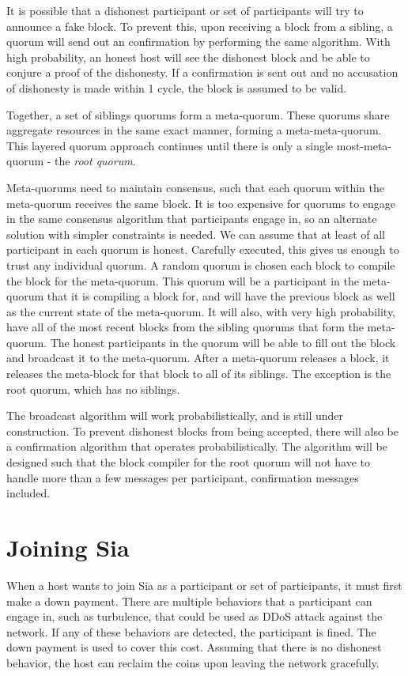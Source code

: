 \documentclass[twocolumn]{article}
\begin{document}
It is possible that a dishonest participant or set of participants will try to announce a fake block.
To prevent this, upon receiving a block from a sibling, a quorum will send out an confirmation by performing the same algorithm.
With high probability, an honest host will see the dishonest block and be able to conjure a proof of the dishonesty.
If a confirmation is sent out and no accusation of dishonesty is made within 1 cycle, the block is assumed to be valid.

Together, a set of siblings quorums form a meta-quorum.
These quorums share aggregate resources in the same exact manner, forming a meta-meta-quorum.
This layered quorum approach continues until there is only a single most-meta-quorum - the \textit{root quorum}.

Meta-quorums need to maintain consensus, such that each quorum within the meta-quorum receives the same block.
It is too expensive for quorums to engage in the same consensus algorithm that participants engage in, so an alternate solution with simpler constraints is needed.
We can assume that at least \integrity{} of all participant in each quorum is honest.
Carefully executed, this gives us enough to trust any individual quorum.
A random quorum is chosen each block to compile the block for the meta-quorum.
This quorum will be a participant in the meta-quorum that it is compiling a block for, and will have the previous block as well as the current state of the meta-quorum.
It will also, with very high probability, have all of the most recent blocks from the sibling quorums that form the meta-quorum.
The honest participants in the quorum will be able to fill out the block and broadcast it to the meta-quorum.
After a meta-quorum releases a block, it releases the meta-block for that block to all of its siblings.
The exception is the root quorum, which has no siblings.

The broadcast algorithm will work probabilistically, and is still under construction.
To prevent dishonest blocks from being accepted, there will also be a confirmation algorithm that operates probabilistically.
The algorithm will be designed such that the block compiler for the root quorum will not have to handle more than a few messages per participant, confirmation messages included.

\section{Joining Sia}
When a host wants to join Sia as a participant or set of participants, it must first make a down payment.
There are multiple behaviors that a participant can engage in, such as turbulence, that could be used as DDoS attack against the network.
If any of these behaviors are detected, the participant is fined.
The down payment is used to cover this cost.
Assuming that there is no dishonest behavior, the host can reclaim the coins upon leaving the network gracefully.
\end{document}

